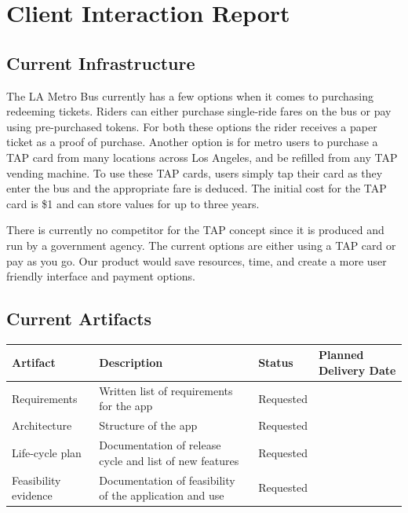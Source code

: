\section{Client Interaction Report}
\subsection{Current Infrastructure}
The LA Metro Bus currently has a few options when it comes to purchasing redeeming tickets. Riders can either purchase single-ride fares on the bus or pay using pre-purchased tokens. For both these options the rider receives a paper ticket as a proof of purchase. Another option is for metro users to purchase a TAP card from many locations across Los Angeles, and be refilled from any TAP vending machine. To use these TAP cards, users simply tap their card as they enter the bus and the appropriate fare is deduced. The initial cost for the TAP card is \$1 and can store values for up to three years. 

There is currently no competitor for the TAP concept since it is produced and run by a government agency. The current options are either using a TAP card or pay as you go. Our product would save resources, time, and create a more user friendly interface and payment options.

\subsection{Current Artifacts}
\begin{table}[h]
    \begin{tabularx}{\textwidth}{lXll}\hline
    Artifact              & Description                                              & Status & Planned Delivery Date          \\
    \hline
    Requirements          & Written list of requirements for the app                 & Requested                   & ~                              \\
    Architecture          & Structure of the app                                     & Requested                   & ~                              \\
    Life-cycle plan       &  Documentation of release cycle and list of new features & Requested                   & ~                              \\
    Feasibility evidence  & Documentation of feasibility of the application and use  & Requested                   & ~                              \\
    \hline
    \end{tabularx}
\end{table}
\newpage
